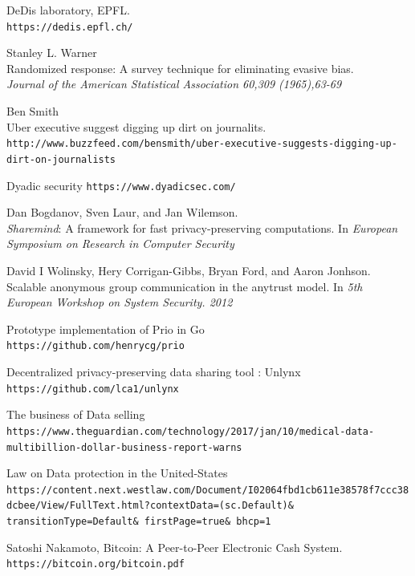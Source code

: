 \documentclass{article}
\begin{document}
\begin{thebibliography}{9}
DeDis laboratory, EPFL.
\\\texttt{https://dedis.epfl.ch/}

Stanley L. Warner\\
Randomized response: A survey technique for eliminating evasive bias.\\
\textit{Journal of the American Statistical Association 60,309 (1965),63-69}

Ben Smith\\
Uber executive suggest digging up dirt on journalits.
\\\texttt{http://www.buzzfeed.com/bensmith/uber-executive-suggests-digging-up-dirt-on-journalists}

Dyadic security \texttt{https://www.dyadicsec.com/}

Dan Bogdanov, Sven Laur, and Jan Wilemson.\\
\textit{Sharemind}: A framework for fast privacy-preserving computations. In \textit{European Symposium on Research in Computer Security}

David I Wolinsky, Hery Corrigan-Gibbs, Bryan Ford, and Aaron Jonhson.\\
Scalable anonymous group communication in the anytrust model. In \textit{5th European Workshop on System Security. 2012}


Prototype implementation of Prio in Go
\\\texttt{https://github.com/henrycg/prio}

Decentralized privacy-preserving data sharing tool : Unlynx\\
\texttt{https://github.com/lca1/unlynx}

The business of Data selling\\
\begingroup
\fontsize{8pt}{10pt}
\texttt{https://www.theguardian.com/technology/2017/jan/10/medical-data-multibillion-dollar-business-report-warns}
\endgroup

Law on Data protection in the United-States\\
\begingroup
\fontsize{8pt}{10pt}
\texttt{https://content.next.westlaw.com/Document/I02064fbd1cb611e38578f7ccc38dcbee/View/FullText.html?contextData=(sc.Default)\& transitionType=Default\& firstPage=true\& bhcp=1}
\endgroup


Satoshi Nakamoto, Bitcoin: A Peer-to-Peer Electronic Cash System.\\
\texttt{https://bitcoin.org/bitcoin.pdf}


\end{thebibliography}
\end{document}
